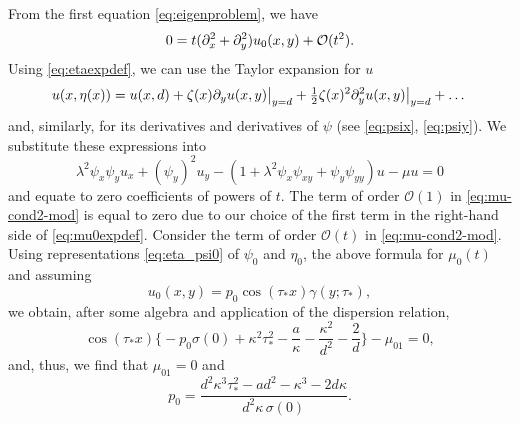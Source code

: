 \documentclass[oneside,a4paper,11pt]{article}
\theoremstyle{thmstyletwo}%
\theoremstyle{thmstylethree}%
\numberwithin{equation}{section}
\newcommand{\pd}[2][]{
\if\relax#1\relax
 \partial_{#2}%
\else
 \partial_{#2}^{#1}%
\fi}
\def\gamm{\gamma}
\def\taust{\tau_{*}}
\def\Disp{\sigma}
\def\dUd{\kappa}
\def\mddU{a}
\def\Obig{\mathcal{O}}
\begin{document}
From the first equation \eqref{eq:eigenproblem}, we have
\begin{equation*}
0=t(\pd[2]{x}+\pd[2]{y})u_0(x,y)+\Obig(t^2).
\end{equation*}
Using \eqref{eq:etaexpdef},
 we can use the Taylor expansion for $u$
\begin{equation*}
u(x,\eta(x)) = u(x,d) + \zeta(x)\pd{y}u(x,y)\bigr|_{y=d} + \tfrac12\zeta(x)^2 \pd[2]{y}u(x,y)\bigr|_{y=d} +\dots
\end{equation*}
and, similarly, for its derivatives and derivatives of $\psi$ (see \eqref{eq:psix}, \eqref{eq:psiy}).
 We substitute these expressions into
\begin{equation}
\lambda^2\psi_x\psi_y u_x+(\psi_y)^2 u_y-(1+\lambda^2\psi_x\psi_{xy}+\psi_y\psi_{yy})u-\mu u=0
\label{eq:mu-cond2-mod}
\end{equation}
and equate to zero coefficients of powers of $t$. The term of order $\Obig(1)$ in \eqref{eq:mu-cond2-mod} is equal to zero due to our choice of the first term in the right-hand side of \eqref{eq:mu0expdef}.
Consider the term of order $\Obig(t)$ in \eqref{eq:mu-cond2-mod}. Using representations \eqref{eq:eta_psi0} of $\psi_0$ and $\eta_0$, the above formula for $\mu_0(t)$ and assuming
\[
u_0(x,y)=p_0\cos(\taust x)\gamm(y;\taust),
\]
we obtain, after some algebra and application of the dispersion relation,
\begin{equation*}
\cos(\taust x)\biggl\{-p_0\Disp(0)+\dUd^2\taust^2-\frac{\mddU}{\dUd}-\frac{\dUd^2}{d^2}-\frac{2}{d}\biggr\}-\mu_{01}=0,
\end{equation*}
and, thus, we find that $\mu_{01}=0$ and
\begin{equation}
p_0 = \frac{d^2\dUd^3\taust^2-\mddU d^2-\dUd^3-2d\dUd}{d^2\dUd\,\Disp(0)}.
\label{eq:p0def}
\end{equation}
\end{document}
